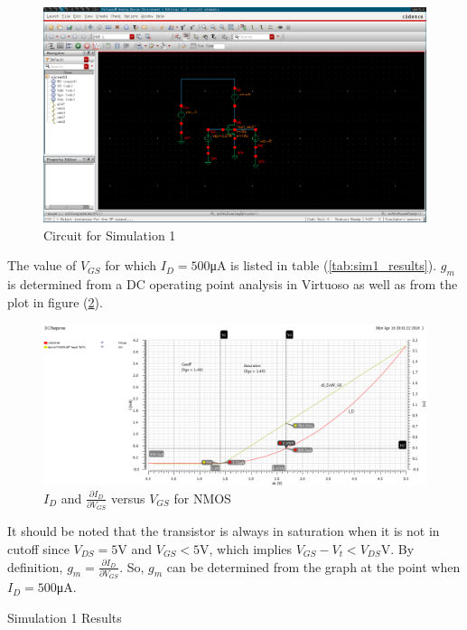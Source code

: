 \FloatBarrier

\begin{figure}[h!]
	\centering
	\includegraphics[scale=0.3]{../images/circuit1.PNG}
	\caption{Circuit for Simulation 1}
	\label{fig:circuit1}
\end{figure}

\FloatBarrier

The value of $V_{GS}$ for which $I_{D} = 500$\si{\micro\ampere} is listed in table (\ref{tab:sim1_results}).
$g_{m}$ is determined from a DC operating point analysis in Virtuoso as well as from the plot in figure (\ref{fig:id_vs_vgs}).

\FloatBarrier

\begin{figure}[h!]
	\centering
	\includegraphics[scale=0.3]{../images/500ua_point.PNG}
	\caption{$I_{D}$ and $\frac{\partial I_{D}}{\partial V_{GS}}$ versus $V_{GS}$ for NMOS}
	\label{fig:id_vs_vgs}
\end{figure}

\FloatBarrier

It should be noted that the transistor is always in saturation when it is not in cutoff since $V_{DS} = 5$\si{\volt} and $V_{GS} < 5$\si{\volt}, which implies $V_{GS} - V_{t} < V_{DS}$\si{\volt}.
By definition, $g_{m} = \frac{\partial I_{D}}{\partial V_{GS}}$.
So, $g_{m}$ can be determined from the graph at the point when $I_{D} = 500$\si{\micro\ampere}.

\FloatBarrier

\begin{table}[h!]
	\centering
	\caption{Simulation 1 Results}
	\label{tab:sim1_results}
\end{table}

\FloatBarrier
